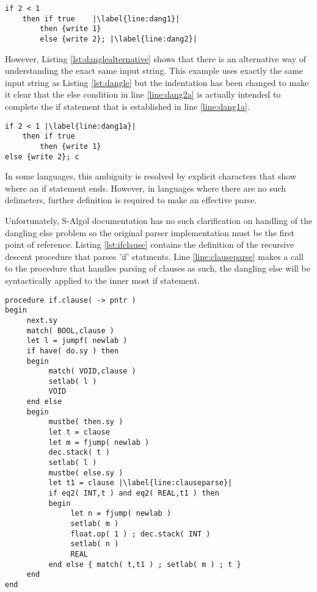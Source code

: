 \documentclass{article}
\begin{document}
\begin{lstlisting}[caption={S-Algol dangling else},label={lst:dangle}, escapechar="|"]
if 2 < 1
	then if true	|\label{line:dang1}|
		then {write 1}
		else {write 2}; |\label{line:dang2}|
\end{lstlisting}

However, Listing \ref{lst:danglealternative} shows that there is an alternative way of understanding the exact same input string. This example uses exactly the same input string as Listing \ref{lst:dangle} but the indentation has been changed to make it clear that the else condition in line \ref{line:dang2a} is actually intended to complete the if statement that is established in line \ref{line:dang1a}.

\begin{lstlisting}[caption={S-Algol dangling else alternative parse},label={lst:danglealternative}, escapechar="|"]
if 2 < 1 |\label{line:dang1a}|
	then if true 
		then {write 1}
else {write 2}; c
\end{lstlisting}

In some languages, this ambiguity is resolved by explicit characters that show where an if statement ends. However, in languages where there are no such delimeters, further definition is required to make an effective parse.

Unfortunately, S-Algol documentation has no such clarification on handling of the dangling else problem so the original parser implementation must be the first point of reference. Listing \ref{lst:ifclause} contains the definition of the recursive descent procedure that parses 'if' statments. Line \ref{line:clauseparse} makes a call to the procedure that handles parsing of clauses as such, the dangling else will be syntactically applied to the inner most if statement.

\begin{lstlisting}[caption={S-Algol compiler implementation of parsing an 'if' statement},label={lst:ifclause}, escapechar="|"]
procedure if.clause( -> pntr )
begin
     next.sy
     match( BOOL,clause )
     let l = jumpf( newlab )
     if have( do.sy ) then
     begin
          match( VOID,clause )
          setlab( l )
          VOID
     end else
     begin
          mustbe( then.sy )
          let t = clause
          let m = fjump( newlab )
          dec.stack( t )
          setlab( l )
          mustbe( else.sy )
          let t1 = clause |\label{line:clauseparse}|
          if eq2( INT,t ) and eq2( REAL,t1 ) then
          begin
               let n = fjump( newlab )
               setlab( m )
               float.op( 1 ) ; dec.stack( INT )
               setlab( n )
               REAL
          end else { match( t,t1 ) ; setlab( m ) ; t }
     end
end
\end{lstlisting}
\end{document}
